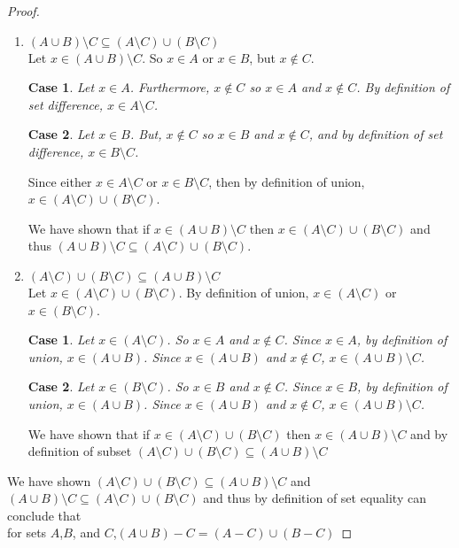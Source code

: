\documentclass[12pt]{article}
\numberwithin{subcase}{case}
\newtheorem{case1}{Case}
\newtheorem{case2}{Case}
\begin{document}
\begin{proof}
\begin{enumerate}
\item $(A \cup B) \setminus C \subseteq (A \setminus C)\cup (B \setminus C)$\\
  Let $x \in (A \cup B) \setminus C$. So $x \in A$ or $x \in B$, but $x \not\in C$.
\begin{case1}
   Let $x \in A$. Furthermore, $x \not\in C$ so $x \in A$ and $x \not\in C$. By definition of set difference,
   $x \in A \setminus C$.
\end{case1}
\begin{case1}
  Let $x \in B$. But, $x \not\in C$ so $x \in B$ and $x \not\in C$, and by definition of set difference, $x
  \in B \setminus C$.
\end{case1}
Since either $x \in A \setminus C$ or $x \in B \setminus C$, then by definition of union, $x \in (A \setminus
C) \cup (B \setminus C)$.

We have shown that if $x \in (A \cup B) \setminus C$ then $x \in (A \setminus C)\cup (B \setminus C)$ and thus
$(A \cup B) \setminus C \subseteq (A \setminus C)\cup (B \setminus C)$.

\item $(A \setminus C)\cup (B \setminus C) \subseteq (A \cup B) \setminus C$\\
Let $x \in (A \setminus C)\cup (B \setminus C)$. By definition of union, $x \in (A \setminus C)$ or $x \in (B
\setminus C)$.
\begin{case2}
  Let $x \in (A \setminus C)$. So $x \in A$ and $x \not\in C$. Since $x \in A$, by definition of union, $x \in
  (A \cup B)$. Since $x \in (A \cup B)$ and $x \not\in C$, $x \in (A \cup B) \setminus C$.
\end{case2}
\begin{case2}
  Let $x \in (B \setminus C)$. So $x \in B$ and $x \not\in C$. Since $x \in B$, by definition of union, $x \in
  (A \cup B)$. Since $x \in (A \cup B)$ and $x \not\in C$, $x \in (A \cup B) \setminus C$.
\end{case2}
We have shown that if $x \in (A \setminus C) \cup (B \setminus C)$ then $x \in (A \cup B) \setminus C$ and
by definition of subset $(A \setminus C)\cup (B \setminus C) \subseteq (A \cup B) \setminus C$
\end{enumerate}

We have shown $(A \setminus C)\cup (B \setminus C) \subseteq (A \cup B) \setminus C$ and $(A \cup B) \setminus
C \subseteq (A \setminus C)\cup (B \setminus C)$ and thus by definition of set equality can conclude that\\ for
sets $A$,$B$, and $C$,$(A\cup B) - C = (A - C) \cup (B - C)$
\end{proof}
\end{document}
